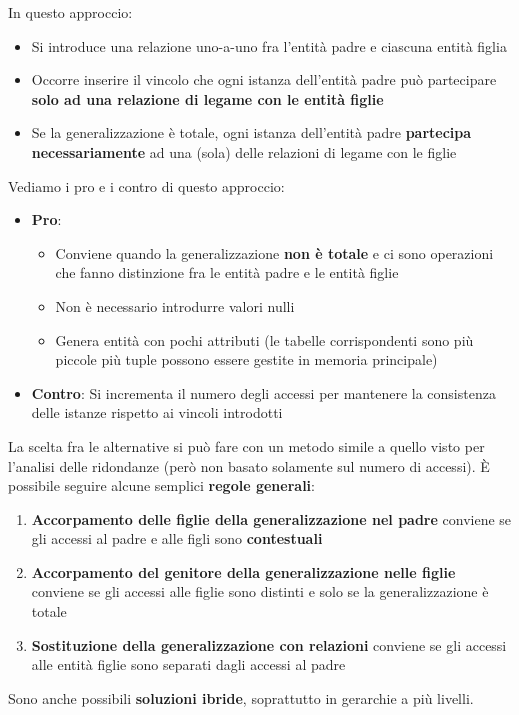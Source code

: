 \documentclass[12pt]{article}
\begin{document}
In questo approccio:
\begin{itemize}
    \item Si introduce una relazione uno-a-uno fra l'entità padre e ciascuna entità figlia
    \item Occorre inserire il vincolo che ogni istanza dell'entità padre può partecipare \textbf{solo ad una relazione di legame con le entità figlie}
    \item Se la generalizzazione è totale, ogni istanza dell'entità padre \textbf{partecipa necessariamente} ad una (sola) delle relazioni di legame con le figlie
\end{itemize}
Vediamo i pro e i contro di questo approccio:
\begin{itemize}
    \item \textbf{Pro}:
    \begin{itemize}
        \item Conviene quando la generalizzazione \textbf{non è totale} e ci sono operazioni che fanno distinzione fra le entità padre e le entità figlie
        \item Non è necessario introdurre valori nulli
        \item Genera entità con pochi attributi (le tabelle corrispondenti sono più piccole più tuple possono essere gestite in memoria principale)
    \end{itemize}
    \item \textbf{Contro}: Si incrementa il numero degli accessi per mantenere la consistenza delle istanze rispetto ai vincoli introdotti
\end{itemize}
La scelta fra le alternative si può fare con un metodo simile a quello visto per l'analisi delle ridondanze (però non basato solamente sul numero di accessi).
È possibile seguire alcune semplici \textbf{regole generali}:
\begin{enumerate}
    \item \textbf{Accorpamento delle figlie della generalizzazione nel padre} conviene se gli accessi al padre e alle figli sono \textbf{contestuali}
    \item \textbf{Accorpamento del genitore della generalizzazione nelle figlie} conviene se gli accessi alle figlie sono distinti e solo se la generalizzazione è totale
    \item \textbf{Sostituzione della generalizzazione con relazioni} conviene se gli accessi alle entità figlie sono separati dagli accessi al padre
\end{enumerate}
Sono anche possibili \textbf{soluzioni ibride}, soprattutto in gerarchie a più livelli.
\end{document}
